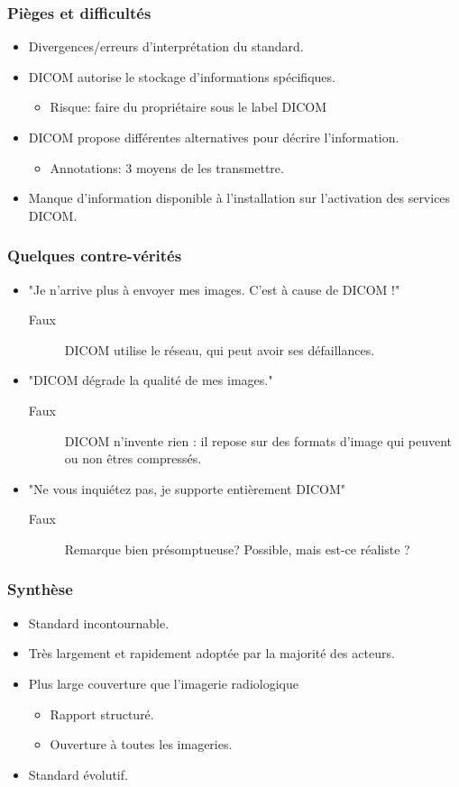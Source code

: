 \frame
{
	\frametitle{Pi\`eges et difficult\'es}
	\begin{itemize}
		\item Divergences/erreurs d'interpr\'etation du standard.
		\item DICOM autorise le stockage d'informations sp\'ecifiques.
		\begin{itemize}
			\item Risque: faire du propri\'etaire sous le label DICOM
		\end{itemize}
		\item DICOM propose diff\'erentes alternatives pour d\'ecrire l'information.
		\begin{itemize}
			\item Annotations: 3 moyens de les transmettre.
		\end{itemize}
		\item Manque d'information disponible \`a l'installation sur l'activation des services DICOM.
	\end{itemize}
}

\frame
{
	\frametitle{Quelques contre-v\'erit\'es}
	\begin{itemize}
		\item "Je n'arrive plus \`a envoyer mes images. C'est \`a cause de DICOM !"
		\begin{description}
			\item[Faux] DICOM utilise le r\'eseau, qui peut avoir ses d\'efaillances.
		\end{description}
		\item "DICOM d\'egrade la qualit\'e de mes images."
		\begin{description}
			\item[Faux] DICOM n'invente rien : il repose sur des formats d'image qui peuvent ou non \^etres compress\'es.
		\end{description}
		\item "Ne vous inqui\'etez pas, je supporte enti\`erement DICOM"
		\begin{description}
			\item[Faux] Remarque bien pr\'esomptueuse?
			Possible, mais est-ce r\'ealiste ?
		\end{description}
	\end{itemize}
}

\frame
{
	\frametitle{Synth\`ese}
	\begin{itemize}
		\item Standard incontournable.
		\item Tr\`es largement et rapidement adopt\'ee par la majorit\'e des acteurs.
		\item Plus large couverture que l'imagerie radiologique
		\begin{itemize}
			\item Rapport structur\'e.
			\item Ouverture \`a toutes les imageries.
		\end{itemize}
		\item Standard \'evolutif.
	\end{itemize}
}
